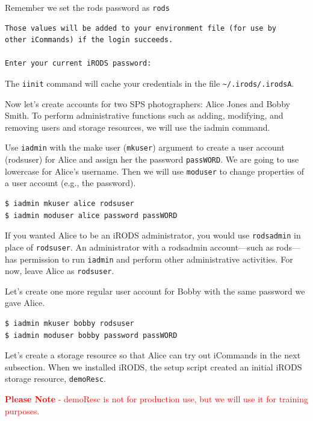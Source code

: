 \documentclass[10pt,oneside]{memoir}
\begin{document}
Remember we set the rods password as \texttt{rods}

\begin{lstlisting}[basicstyle=\scriptsize\ttfamily]
Those values will be added to your environment file (for use by
other iCommands) if the login succeeds.

Enter your current iRODS password:
\end{lstlisting}



The \texttt{iinit} command will cache your credentials in the file \texttt{\textasciitilde/.irods/.irodsA}.



Now let's create accounts for two SPS photographers: Alice Jones and Bobby Smith. To perform administrative functions such as adding, modifying, and removing users and storage resources, we will use the iadmin command.

Use \texttt{iadmin} with the make user (\texttt{mkuser}) argument to create a user account (rodsuser) for Alice and assign her the password \texttt{passWORD}. We are going to use lowercase for Alice's username. Then we will use \texttt{moduser} to change properties of a user account (e.g., the password).

\begin{lstlisting}
$ iadmin mkuser alice rodsuser
$ iadmin moduser alice password passWORD
\end{lstlisting}

If you wanted Alice to be an iRODS administrator, you would use \texttt{rodsadmin} in place of \texttt{rodsuser}. An administrator with a rodsadmin account---such as rods---has permission to run \texttt{iadmin} and perform other administrative activities. For now, leave Alice as \texttt{rodsuser}.

Let's create one more regular user account for Bobby with the same password we gave Alice.

\begin{lstlisting}
$ iadmin mkuser bobby rodsuser
$ iadmin moduser bobby password passWORD
\end{lstlisting}

Let's create a storage resource so that Alice can try out iCommands in the next subsection. When we installed iRODS, the setup script created an initial iRODS storage resource, \texttt{demoResc}.

\textcolor{red}{\textbf{Please Note} - demoResc is not for production use, but we will use it for training purposes.}
\end{document}
